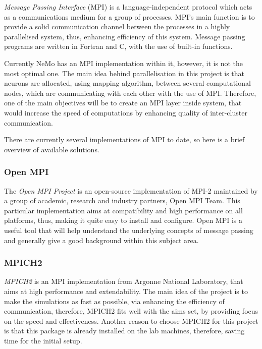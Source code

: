 \emph{Message Passing Interface} (MPI) is a language-independent protocol which acts as a communications medium for a group of processes.\cite{mpi} MPI's main function is to provide
a solid communication channel between the processes in a highly parallelised system, thus, enhancing efficiency of this system. Message passing programs are written in Fortran and 
C, with the use of built-in functions.

Currently NeMo has an MPI implementation within it, however, it is not the most optimal one. The main idea behind parallelisation in this project is that neurons are allocated, 
using mapping algorithm, between several computational nodes, which are communicating with each other with the use of MPI. Therefore, one of the main objectives will be to 
create an MPI layer inside system, that would increase the speed of computations by enhancing quality of inter-cluster communication.

There are currently several implementations of MPI to date, so here is a brief overview of available solutions.

\subsubsection{Open MPI}

The \emph{Open MPI Project} is an open-source implementation of MPI-2 maintained by a group of academic, research and industry partners, Open MPI Team.\cite{RichardL.Graham2005} This particular 
implementation aims at compatibility and high performance on all platforms, thus, making it quite easy to install and configure. Open MPI is a useful tool that will help understand 
the underlying concepts of message passing and generally give a good background within this subject area.

\subsubsection{MPICH2}

\emph{MPICH2} is an MPI implementation from Argonne National Laboratory, that aims at high performance and extendability.\cite{W.Gropp1999} The main idea of the project is to make the simulations as
fast as possible, via enhancing the efficiency of communication, therefore, MPICH2 fits well with the aims set, by providing focus on the speed and effectiveness. Another reason to choose 
MPICH2 for this project is that this package is already installed on the lab machines, therefore, saving time for the initial setup.\cite{W.Gropp1999a}

